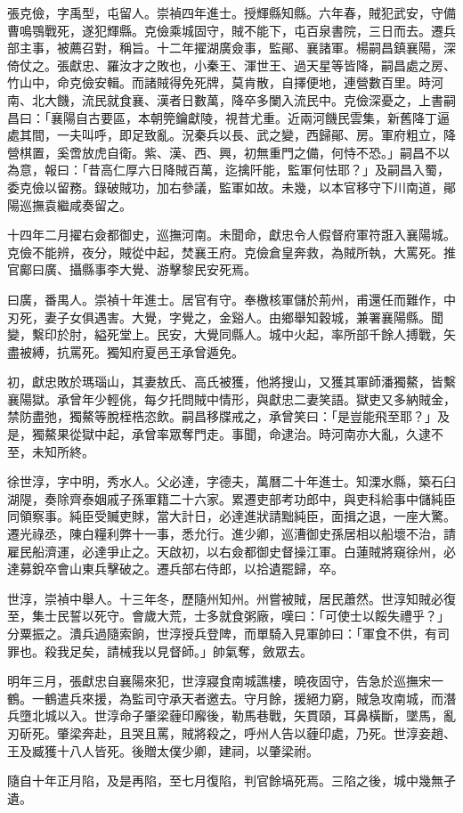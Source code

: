 \begin{pinyinscope}
張克儉，字禹型，屯留人。崇禎四年進士。授輝縣知縣。六年春，賊犯武安，守備曹鳴鶚戰死，遂犯輝縣。克儉乘城固守，賊不能下，屯百泉書院，三日而去。遷兵部主事，被薦召對，稱旨。十二年擢湖廣僉事，監鄖、襄諸軍。楊嗣昌鎮襄陽，深倚仗之。張獻忠、羅汝才之敗也，小秦王、渾世王、過天星等皆降，嗣昌處之房、竹山中，命克儉安輯。而諸賊得免死牌，莫肯散，自擇便地，連營數百里。時河南、北大饑，流民就食襄、漢者日數萬，降卒多闌入流民中。克儉深憂之，上書嗣昌曰：「襄陽自古要區，本朝筦鑰獻陵，視昔尤重。近兩河饑民雲集，新舊降丁逼處其間，一夫叫呼，即足致亂。況秦兵以長、武之變，西歸鄖、房。軍府粗立，降營棋置，奚啻放虎自衛。紫、漢、西、興，初無重門之備，何恃不恐。」嗣昌不以為意，報曰：「昔高仁厚六日降賊百萬，迄擒阡能，監軍何怯耶？」及嗣昌入蜀，委克儉以留務。錄破賊功，加右參議，監軍如故。未幾，以本官移守下川南道，鄖陽巡撫袁繼咸奏留之。

十四年二月擢右僉都御史，巡撫河南。未聞命，獻忠令人假督府軍符誑入襄陽城。克儉不能辨，夜分，賊從中起，焚襄王府。克儉倉皇奔救，為賊所執，大罵死。推官鄺曰廣、攝縣事李大覺、游擊黎民安死焉。

曰廣，番禺人。崇禎十年進士。居官有守。奉檄核軍儲於荊州，甫還任而難作，中刃死，妻子女俱遇害。大覺，字覺之，金谿人。由鄉舉知穀城，兼署襄陽縣。聞變，繫印於肘，縊死堂上。民安，大覺同縣人。城中火起，率所部千餘人搏戰，矢盡被縛，抗罵死。獨知府夏邑王承曾遁免。

初，獻忠敗於瑪瑙山，其妻敖氏、高氏被獲，他將搜山，又獲其軍師潘獨鰲，皆繫襄陽獄。承曾年少輕佻，每夕托問賊中情形，與獻忠二妻笑語。獄吏又多納賊金，禁防盡弛，獨鰲等脫桎梏恣飲。嗣昌移牒戒之，承曾笑曰：「是豈能飛至耶？」及是，獨鰲果從獄中起，承曾率眾奪門走。事聞，命逮治。時河南亦大亂，久逮不至，未知所終。

徐世淳，字中明，秀水人。父必達，字德夫，萬曆二十年進士。知溧水縣，築石臼湖隄，奏除齊泰姻戚子孫軍籍二十六家。累遷吏部考功郎中，與吏科給事中儲純臣同領察事。純臣受贓吏賕，當大計日，必達進狀請黜純臣，面揖之退，一座大驚。遷光祿丞，陳白糧利弊十一事，悉允行。進少卿，巡漕御史孫居相以船壞不治，請雇民船濟運，必達爭止之。天啟初，以右僉都御史督操江軍。白蓮賊將窺徐州，必達募銳卒會山東兵擊破之。遷兵部右侍郎，以拾遺罷歸，卒。

世淳，崇禎中舉人。十三年冬，歷隨州知州。州嘗被賊，居民蕭然。世淳知賊必復至，集士民誓以死守。會歲大荒，士多就食粥廠，嘆曰：「可使士以餒失禮乎？」分粟振之。潰兵過隨索餉，世淳授兵登陴，而單騎入見軍帥曰：「軍食不供，有司罪也。殺我足矣，請械我以見督師。」帥氣奪，斂眾去。

明年三月，張獻忠自襄陽來犯，世淳寢食南城譙樓，曉夜固守，告急於巡撫宋一鶴。一鶴遣兵來援，為監司守承天者邀去。守月餘，援絕力窮，賊急攻南城，而潛兵墮北城以入。世淳命子肇梁薶印廨後，勒馬巷戰，矢貫頤，耳鼻橫斷，墜馬，亂刃斫死。肇梁奔赴，且哭且罵，賊將殺之，呼州人告以薶印處，乃死。世淳妾趙、王及臧獲十八人皆死。後贈太僕少卿，建祠，以肇梁祔。

隨自十年正月陷，及是再陷，至七月復陷，判官餘塙死焉。三陷之後，城中幾無孑遺。


\end{pinyinscope}